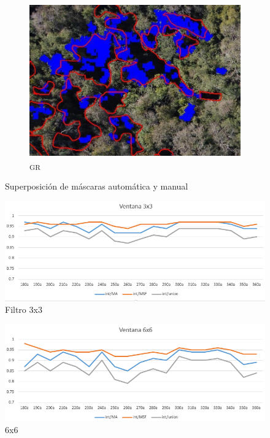 \begin{figure}[h!]
 \begin{subfigure}[b]{\textwidth}
    \includegraphics[width=\textwidth]{Imagenes/green minus red 85.png}
     \hfill
     \caption{\textpsi\textsubscript{GR}}
    \label{verderojo}
 \end{subfigure}
 \caption{Superposición de máscaras automática y manual}
        \label{p85BRBGGR}
\end{figure}

\begin{figure}[h!]
    \includegraphics[width=\textwidth]{Imagenes/filter 3x3.png}
     \hfill
     \caption{Filtro 3x3}
    \label{filter3x3}
\end{figure}

\begin{figure}[h!]
    \includegraphics[width=\textwidth]{Imagenes/filter 6x6.png}
     \hfill
     \caption{6x6}
    \label{filter6x6}
\end{figure}

